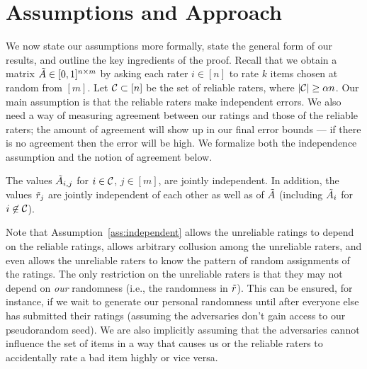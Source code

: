 \section{Assumptions and Approach}
\label{sec:assumptions}
\label{sec:approach}

We now state our assumptions more formally, state the general form 
of our results, and outline the key ingredients of the proof.
Recall that we obtain a matrix $\tilde{A} \in [0,1]^{n \times m}$ by asking each 
rater $i \in [n]$ to rate $k$ items chosen at random from $[m]$.
Let $\mathcal{C} \subset [n]$ be the set of reliable raters, where $|\mathcal{C}| \geq \alpha n$.
Our main assumption is that the reliable raters make independent errors. We also 
need a way of measuring agreement between our ratings and those of the reliable 
raters; the amount of agreement will show up in our final error bounds --- if 
there is no agreement then the error will be high. We formalize both the 
independence assumption and the notion of agreement below.

\begin{assumption}[Independence]
\label{ass:independent}
The values $\tilde{A}_{i,j}$ for $i \in \mathcal{C}$, $j \in [m]$, are 
jointly independent.
In addition, the values $\tilde{r}_j$ are jointly independent 
of each other as well as of $\tilde{A}$ (including $\tilde{A}_i$ for $i \not \in \mathcal{C}$).
\end{assumption}
Note that Assumption~\ref{ass:independent} allows the unreliable ratings to 
depend on the reliable ratings, allows arbitrary collusion among the unreliable 
raters, and even allows the unreliable raters to know the pattern of random 
assignments of the ratings. The only restriction on the unreliable raters is 
that they may not depend on \emph{our} randomness (i.e., the randomness in 
$\tilde{r}$). This can be ensured, for instance, if we wait to generate our 
personal randomness until after everyone else has submitted their ratings 
(assuming the adversaries don't gain access to our pseudorandom seed). We are 
also implicitly assuming that the adversaries cannot influence the set of 
items in a way that causes us or the reliable raters to accidentally rate a bad 
item highly or vice versa.


